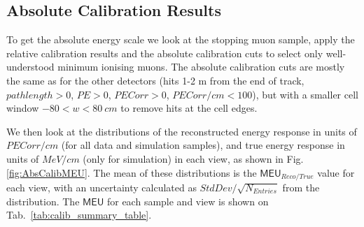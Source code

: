 \subsection{Absolute Calibration Results}
To get the absolute energy scale we look at the stopping muon sample, apply the relative calibration results and the absolute calibration cuts to select only well-understood minimum ionising muons. The absolute calibration cuts are mostly the same as for the other detectors (hits 1-2 m from the end of track, $\unit{pathlength}>0$, $\unit{PE}>0$, $\unit{PECorr} > 0$, $\unit{PECorr/cm} < 100$), but with a smaller cell window $-80<w<80\ \unit{cm}$ to remove hits at the cell edges.

We then look at the distributions of the reconstructed energy response in units of $\unit{PECorr/cm}$ (for all data and simulation samples), and true energy response in units of $\unit{MeV/cm}$ (only for simulation) in each view, as shown in Fig. \ref{fig:AbsCalibMEU}. The mean of these distributions is the $\textsf{MEU}_{Reco/True}$ value for each view, with an uncertainty calculated as $StdDev/\sqrt{N_{Entries}}$ from the distribution. The $\textsf{MEU}$ for each sample and view is shown on Tab.~\ref{tab:calib_summary_table}.


